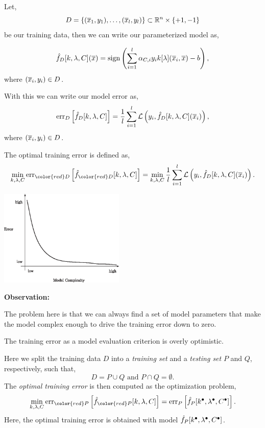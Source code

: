 \documentclass[a4paper,blends,pdf,colorBG,slideColor]{prosper}
\begin{document}
Let,
\begin{equation*}
D = \{(\overline{x}_1,y_1),\ldots,(\overline{x}_l,y_l)\} \subset \mathbb{R}^{n}\times \{+1,-1\}
\end{equation*}
be our training data, then we can write our parameterized model as,

\begin{equation*}
\label{eq:param-model}
\model{f}_D[k,\lambda,C](\ol{x}) = \sign \left ( \sum_{i=1}^l \alpha_{C,i} y_i  k[\lambda](\ol{x}_i,\ol{x}) - b\right ),
\end{equation*}
where $(\overline{x}_i,y_i)\in D$.

With this we can write our model error as,
\begin{equation*}
\mbox{err}_D\left [\hat{f}_D[k,\lambda,C]\right] = \frac{1}{l} \sum_{i=1}^l {\cal L}\left (y_i,\hat{f}_D[k,\lambda,C](\overline{x}_i)\right),
\end{equation*}
where $(\overline{x}_i, y_i)\in D$.
\es

\small
The optimal training error is defined as,
\begin{equation*}
\min_{k,\lambda,C} \err_{\color{red}D}\left [\model{f}_{\color{red}D}[k,\lambda,C]\right] = \min_{k,\lambda,C}\frac{1}{l} \sum_{i=1}^l \loss\left (y_i,\model{f}_D[k,\lambda,C](\ol{x}_i)\right).
\end{equation*}
\vspace{.2in}
\begin{center}
\includegraphics[height=1.8in]{figures/fig09-01.eps}
\end{center}
\es

{\bf Observation:}

The problem here is that we can always find a set of model parameters that make the 
model complex enough to drive the training error down to zero.

The training error as a model evaluation criterion is overly optimistic.

\es

Here we split the training data $D$ into a {\em training set} and a {\em testing set} 
$P$ and  $Q$, respectively, such that,
\begin{equation*}
D = P \cup Q \text{ and } P\cap Q = \emptyset.
\end{equation*}
The {\em optimal training error} is then computed as
the optimization problem,
\begin{equation*}
\min_{k,\lambda,C} \err_{\color{red}P}\left [\model{f}_{\color{red}P}[k,\lambda,C]\right] = \err_P\left [\model{f}_P[k^{\bullet},\lambda^{\bullet},C^{\bullet}]\right].
\end{equation*}
Here, the optimal training error is obtained with model $\hat{f}_P[k^{\bullet},\lambda^{\bullet},C^{\bullet}]$.
\end{document}
